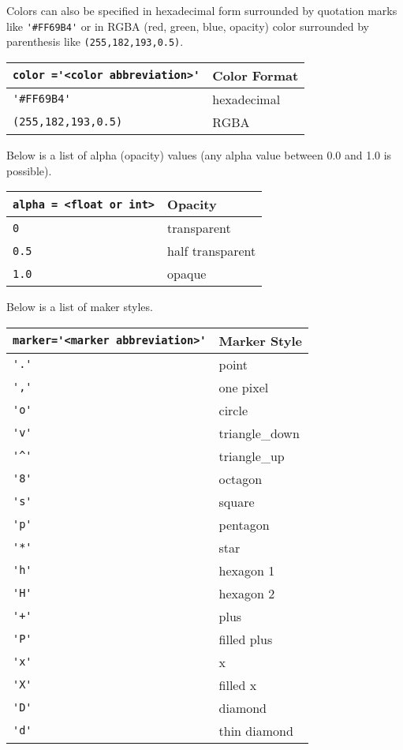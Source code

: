\documentclass{book}
\newcommand{\passthrough}[1]{#1}
\begin{document}
Colors can also be specified in hexadecimal form surrounded by quotation
marks like \passthrough{\lstinline!'#FF69B4'!} or in RGBA (red, green,
blue, opacity) color surrounded by parenthesis like
\passthrough{\lstinline!(255,182,193,0.5)!}.

\begin{longtable}[]{@{}ll@{}}
\toprule
\passthrough{\lstinline!color ='<color abbreviation>'!} & Color
Format\tabularnewline
\midrule
\endhead
\passthrough{\lstinline!'#FF69B4'!} & hexadecimal\tabularnewline
\passthrough{\lstinline!(255,182,193,0.5)!} & RGBA\tabularnewline
\bottomrule
\end{longtable}

Below is a list of alpha (opacity) values (any alpha value between 0.0
and 1.0 is possible).

\begin{longtable}[]{@{}ll@{}}
\toprule
\passthrough{\lstinline!alpha = <float or int>!} &
Opacity\tabularnewline
\midrule
\endhead
\passthrough{\lstinline!0!} & transparent\tabularnewline
\passthrough{\lstinline!0.5!} & half transparent\tabularnewline
\passthrough{\lstinline!1.0!} & opaque\tabularnewline
\bottomrule
\end{longtable}

Below is a list of maker styles.

\begin{longtable}[]{@{}ll@{}}
\toprule
\passthrough{\lstinline!marker='<marker abbreviation>'!} & Marker
Style\tabularnewline
\midrule
\endhead
\passthrough{\lstinline!'.'!} & point\tabularnewline
\passthrough{\lstinline!','!} & one pixel\tabularnewline
\passthrough{\lstinline!'o'!} & circle\tabularnewline
\passthrough{\lstinline!'v'!} & triangle\_down\tabularnewline
\passthrough{\lstinline!'^'!} & triangle\_up\tabularnewline
\passthrough{\lstinline!'8'!} & octagon\tabularnewline
\passthrough{\lstinline!'s'!} & square\tabularnewline
\passthrough{\lstinline!'p'!} & pentagon\tabularnewline
\passthrough{\lstinline!'*'!} & star\tabularnewline
\passthrough{\lstinline!'h'!} & hexagon 1\tabularnewline
\passthrough{\lstinline!'H'!} & hexagon 2\tabularnewline
\passthrough{\lstinline!'+'!} & plus\tabularnewline
\passthrough{\lstinline!'P'!} & filled plus\tabularnewline
\passthrough{\lstinline!'x'!} & x\tabularnewline
\passthrough{\lstinline!'X'!} & filled x\tabularnewline
\passthrough{\lstinline!'D'!} & diamond\tabularnewline
\passthrough{\lstinline!'d'!} & thin diamond\tabularnewline
\bottomrule
\end{longtable}
\end{document}
